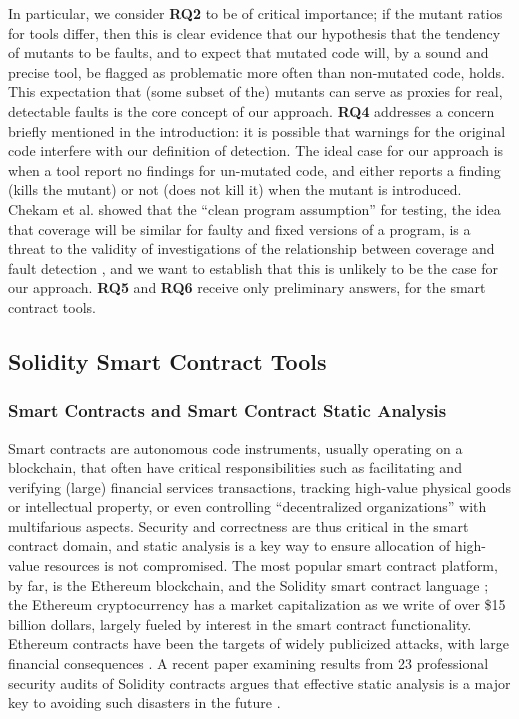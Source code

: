 In particular, we consider {\bf RQ2} to be of critical importance; if the mutant ratios for tools differ, then this is clear evidence that our hypothesis that the tendency of mutants to be faults, and to expect that mutated code will, by a sound and precise tool, be flagged as problematic more often than non-mutated code, holds.  This expectation that (some subset of the) mutants can serve as proxies for real, detectable faults is the core concept of our approach.
{\bf RQ4} addresses a concern briefly mentioned in the introduction:  it is possible that warnings for the original code interfere with our definition of detection.  The ideal case for our approach is when a tool report no findings for un-mutated code, and either reports a finding (kills the mutant) or not (does not kill it) when the mutant is introduced.  Chekam et al. showed that the ``clean program assumption'' for testing, the idea that coverage will be similar for faulty and fixed versions of a program, is a threat to the validity of investigations of the relationship between coverage and fault detection \cite{CleanProgram}, and we want to establish that this is unlikely to be the case for our approach.
{\bf RQ5} and {\bf RQ6} receive only preliminary answers, for the smart contract tools.

\subsection{Solidity Smart Contract Tools}

\subsubsection{Smart Contracts and Smart Contract Static Analysis}

Smart contracts are autonomous code instruments, usually operating on a blockchain, that often have critical responsibilities such as facilitating and verifying (large) financial services transactions, tracking high-value physical goods or intellectual property, or even controlling ``decentralized organizations'' with multifarious aspects.  Security and correctness are thus critical in the smart contract domain, and static analysis is a key way to ensure allocation of high-value resources is not compromised.  The most popular smart contract platform, by far, is the Ethereum blockchain, and the Solidity smart contract language \cite{buterin2013whitepaper,wood2014yellow}; the Ethereum cryptocurrency has a market capitalization as we write of over \$15 billion dollars, largely fueled by interest in the smart contract functionality.  Ethereum contracts have been the targets of widely publicized attacks, with large financial consequences  \cite{spank,DAO}.   A recent paper examining results from 23 professional security audits of Solidity contracts argues that effective static analysis is a major key to avoiding such disasters in the future \cite{FC20}.

